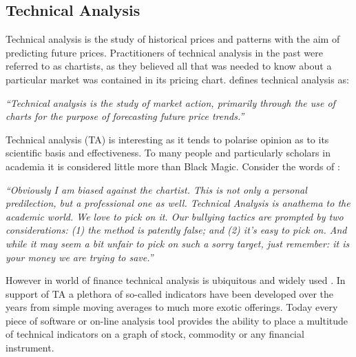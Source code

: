 
\subsection{Technical Analysis}
\label{chp1:ta}
Technical analysis is the study of historical prices and patterns with the aim of predicting future prices. Practitioners of technical analysis in the past were referred to as chartists, as they believed all that was needed to know about a particular market was contained in its pricing chart. \cite{murphy1999technical} defines technical analysis as:


\textit{\textquotedblleft Technical analysis is the study of market action, primarily through the use of charts for the purpose of forecasting future price trends.\textquotedblright}

Technical analysis (TA) is interesting as it tends to polarise opinion as to its scientific basis and effectiveness. To many people and particularly scholars in academia it is considered little more than Black Magic. Consider the words of \cite{malkiel1999random}:

\textit{\textquotedblleft Obviously I am biased against the chartist. This is not only a personal predilection, but a professional one as well. Technical Analysis is anathema to the academic world. We love to pick on it. Our bullying tactics are prompted by two considerations: (1) the method is patently false; and (2) it's easy to pick on. And while it may seem a bit unfair to pick on such a sorry target, just remember: it is your money we are trying to save.\textquotedblright}

However in world of finance technical analysis is ubiquitous and widely used \citep{Menkhoff20102573}. In support of TA a plethora of so-called indicators have been developed over the years from simple moving averages to much more exotic offerings. Today every piece of software or on-line analysis tool provides the ability to place a multitude of technical indicators on a graph of stock, commodity or any financial instrument.

